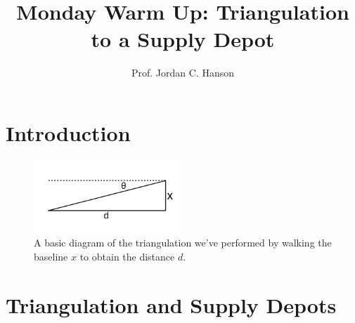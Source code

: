\documentclass{article}
\begin{document}
\twocolumn

\title{Monday Warm Up: Triangulation to a Supply Depot}
\author{Prof. Jordan C. Hanson}

\maketitle

\section{Introduction}

\begin{figure}[ht]
\centering
\includegraphics[width=0.49\textwidth]{CompassTriangle.pdf}
\caption{\label{fig:triang} A basic diagram of the triangulation we've performed by walking the baseline $x$ to obtain the distance $d$.}
\end{figure}

\section{Triangulation and Supply Depots}
\end{document}
